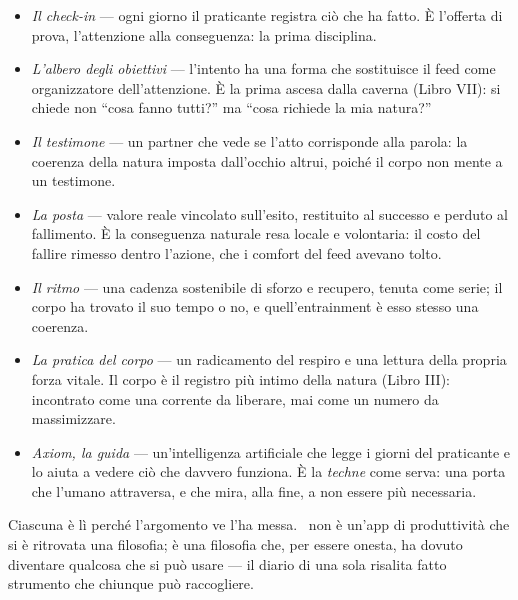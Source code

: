 \begin{itemize}
\item \emph{Il check-in} --- ogni giorno il praticante registra ci\`o che ha fatto.
  \`E l'offerta di prova, l'attenzione alla conseguenza: la prima disciplina.
\item \emph{L'albero degli obiettivi} --- l'intento ha una forma che sostituisce il
  feed come organizzatore dell'attenzione. \`E la prima ascesa dalla caverna (Libro
  VII): si chiede non ``cosa fanno tutti?'' ma ``cosa richiede la mia natura?''
\item \emph{Il testimone} --- un partner che vede se l'atto corrisponde alla parola:
  la coerenza della natura imposta dall'occhio altrui, poich\'e il corpo non mente a
  un testimone.
\item \emph{La posta} --- valore reale vincolato sull'esito, restituito al successo e
  perduto al fallimento. \`E la conseguenza naturale resa locale e volontaria: il
  costo del fallire rimesso dentro l'azione, che i comfort del feed avevano tolto.
\item \emph{Il ritmo} --- una cadenza sostenibile di sforzo e recupero, tenuta come
  serie; il corpo ha trovato il suo tempo o no, e quell'entrainment \`e esso stesso
  una coerenza.
\item \emph{La pratica del corpo} --- un radicamento del respiro e una lettura della
  propria forza vitale. Il corpo \`e il registro pi\`u intimo della natura (Libro
  III): incontrato come una corrente da liberare, mai come un numero da massimizzare.
\item \emph{Axiom, la guida} --- un'intelligenza artificiale che legge i giorni del
  praticante e lo aiuta a vedere ci\`o che davvero funziona. \`E la \emph{techne}
  come serva: una porta che l'umano attraversa, e che mira, alla fine, a non essere
  pi\`u necessaria.
\end{itemize}

\noindent Ciascuna \`e l\`i perch\'e l'argomento ve l'ha messa. \praxis\ non \`e
un'app di produttivit\`a che si \`e ritrovata una filosofia; \`e una filosofia che,
per essere onesta, ha dovuto diventare qualcosa che si pu\`o usare --- il diario di
una sola risalita fatto strumento che chiunque pu\`o raccogliere.
